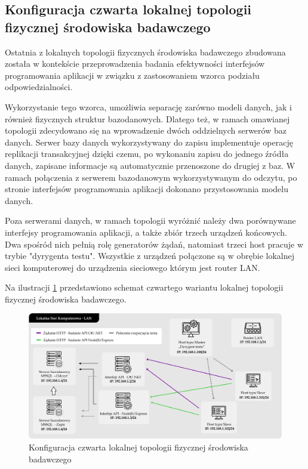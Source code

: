 \subsection*{Konfiguracja czwarta lokalnej topologii fizycznej środowiska badawczego}
\label{sec:lokalne-srodowisko-badawcze-ver-4}
Ostatnia z lokalnych topologii fizycznych środowiska badawczego zbudowana została w kontekście przeprowadzenia badania efektywności interfejsów programowania aplikacji w związku z zastosowaniem wzorca podziału odpowiedzialności.

Wykorzystanie tego wzorca, umożliwia separację zarówno modeli danych, jak i również fizycznych struktur bazodanowych. Dlatego też, w ramach omawianej topologii zdecydowano się na wprowadzenie dwóch oddzielnych serwerów baz danych. Serwer bazy danych wykorzystywany do zapisu implementuje operację replikacji transakcyjnej dzięki czemu, po wykonaniu zapisu do jednego źródła danych, zapisane informacje są automatycznie przenoszone do drugiej z baz. W ramach połączenia z serwerem bazodanowym wykorzystywanym do odczytu, po stronie interfejsów programowania aplikacji dokonano przystosowania modelu danych.

Poza serwerami danych, w ramach topologii wyróżnić należy dwa porównywane interfejsy programowania aplikacji, a także zbiór trzech urządzeń końcowych. Dwa spośród nich pełnią rolę generatorów żądań, natomiast trzeci host pracuje w trybie "dyrygenta testu". Wszystkie z urządzeń połączone są w obrębie lokalnej sieci komputerowej do urządzenia sieciowego którym jest router LAN.

Na ilustracji \ref{fig:topologia-5} przedstawiono schemat czwartego wariantu lokalnej topologii fizycznej środowiska badawczego.

\begin{figure}[ht]
    \centering
     \includegraphics[width=\linewidth]{rys04/topologia-5.png}
    \caption{Konfiguracja czwarta lokalnej topologii fizycznej środowiska badawczego}
    \label{fig:topologia-5}
\end{figure}

